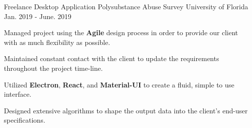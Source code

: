 \begin{cventries}
	
	\cventry
	{Freelance Desktop Application} %
	{Polysubstance Abuse Survey} %
	{University of Florida} %
	{Jan. 2019 - June. 2019} %
	{ %
		\begin{cvitems}
			\setlength{\itemindent}{.125in}
			\item {Managed project using the \textbf{Agile} design process in order to provide our client with as much flexibility as possible.}
			\item {Maintained constant contact with the client to update the requirements throughout the project time-line.}
			\item {Utilized \textbf{Electron}, \textbf{React}, and \textbf{Material-UI} to create a fluid, simple to use interface. }
			\item {Designed extensive algorithms to shape the output data into the client's end-user specifications.}
		\end{cvitems}
	}


	
\end{cventries}
